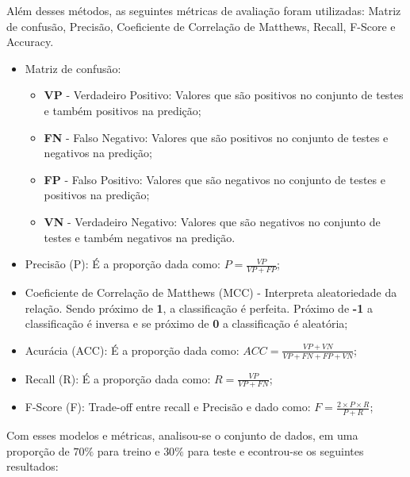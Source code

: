 Além desses métodos, as seguintes métricas de avaliação foram utilizadas: Matriz de confusão, Precisão, Coeficiente de Correlação de Matthews, Recall, F-Score e Accuracy.\\

\begin{itemize}
    \item Matriz de confusão:
          \begin{itemize}
              \item \textbf{VP} - Verdadeiro Positivo: Valores que são positivos no conjunto de testes e também positivos na predição;
              \item \textbf{FN} - Falso Negativo: Valores que são positivos no conjunto de testes e negativos na predição;
              \item \textbf{FP} - Falso Positivo: Valores que são negativos no conjunto de testes e positivos na predição;
              \item \textbf{VN} - Verdadeiro Negativo: Valores que são negativos no conjunto de testes e também negativos na predição.
          \end{itemize}
    \item Precisão (P): É a proporção dada como: $P = \frac{VP}{VP+FP}$;
    \item Coeficiente de Correlação de Matthews (MCC) - Interpreta aleatoriedade da relação. Sendo próximo de \textbf{1}, a classificação é perfeita. Próximo de \textbf{-1} a classificação é inversa e se próximo de \textbf{0} a classificação é aleatória;
    \item Acurácia (ACC): É a proporção dada como: $ACC = \frac{VP+VN}{VP+FN+FP+VN}$;
    \item Recall (R): É a proporção dada como: $R = \frac{VP}{VP+FN}$;
    \item F-Score (F): Trade-off entre recall e Precisão e dado como: $F = \frac{2\times P\times R}{P+R}$;
\end{itemize}

Com esses modelos e métricas, analisou-se o conjunto de dados, em uma proporção de $70\%$ para treino e $30\%$ para teste e econtrou-se os seguintes resultados: